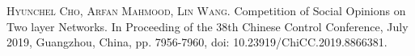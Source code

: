 \begin{publications}{99}
    \item\textsc{Hyunchel Cho, Arfan Mahmood, Lin Wang}. {Competition of Social Opinions on Two layer Networks}. In Proceeding of the 38th Chinese Control Conference, July 2019, Guangzhou, China, pp. 7956-7960, doi: 10.23919/ChiCC.2019.8866381.
\end{publications}


